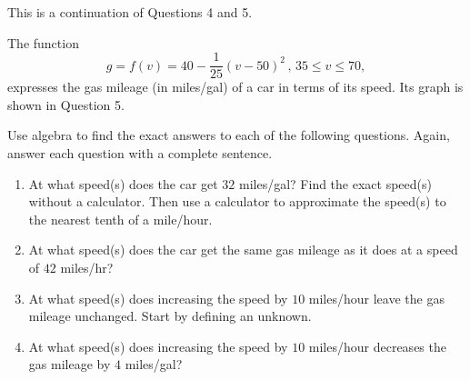 \documentclass{ximera}
\begin{document}
\begin{question} \label{QMDM3er3r3}
This is a continuation of Questions 4 and 5.

The function 
\[
    g = f(v) = 40-\frac{1}{25}\left(v-50\right)^{2} \, , \, 35\leq v \leq 70 ,
\]
expresses the gas mileage (in miles/gal) of a car in terms of its speed. Its graph is shown in Question 5.

Use algebra to find the exact answers to each of the following questions. Again, answer each question with a complete sentence.

\begin{enumerate}
\item At what speed(s) does the car get $32$ miles/gal?  Find the exact speed(s) without a calculator. Then use a calculator to approximate the speed(s) to the nearest tenth of a mile/hour.

\item At what speed(s) does the car get the same gas mileage as it does at a speed of $42$ miles/hr?

\item At what speed(s) does increasing the speed by $10$ miles/hour leave the gas mileage unchanged. Start by defining an unknown.

\item At what speed(s) does increasing the speed by $10$ miles/hour decreases the gas mileage by $4$ miles/gal?

\end{enumerate}






\end{question}
\end{document}
